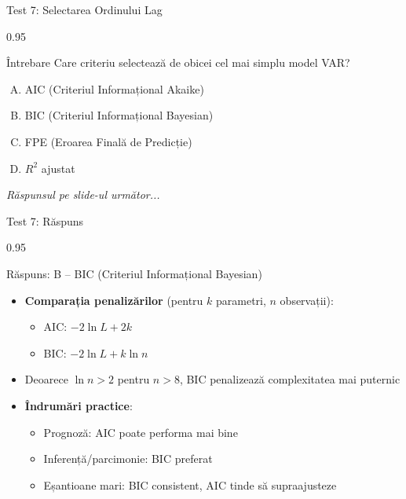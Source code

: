\documentclass[9pt, aspectratio=169, t]{beamer}
\begin{document}
\begin{frame}{Test 7: Selectarea Ordinului Lag}
    \begin{cminipage}{0.95\textwidth}
    \begin{alertblock}{Întrebare}
        Care criteriu selectează de obicei cel mai simplu model VAR?
    \end{alertblock}

    \vspace{0.3cm}

    \begin{enumerate}[A)]\setlength{\itemsep}{0pt}
        \item AIC (Criteriul Informațional Akaike)
        \item BIC (Criteriul Informațional Bayesian)
        \item FPE (Eroarea Finală de Predicție)
        \item $R^2$ ajustat
    \end{enumerate}

    \vspace{0.5cm}
    \begin{flushright}\textit{Răspunsul pe slide-ul următor...}\end{flushright}
    \end{cminipage}
\end{frame}

\begin{frame}{Test 7: Răspuns}
    \begin{cminipage}{0.95\textwidth}
    \begin{exampleblock}{Răspuns: B -- BIC (Criteriul Informațional Bayesian)}
        \begin{itemize}\setlength{\itemsep}{0pt}
            \item \textbf{Comparația penalizărilor} (pentru $k$ parametri, $n$ observații):
            \begin{itemize}\setlength{\itemsep}{0pt}
                \item AIC: $-2\ln L + 2k$
                \item BIC: $-2\ln L + k\ln n$
            \end{itemize}
            \item Deoarece $\ln n > 2$ pentru $n > 8$, BIC penalizează complexitatea mai puternic
            \item \textbf{Îndrumări practice}:
            \begin{itemize}\setlength{\itemsep}{0pt}
                \item Prognoză: AIC poate performa mai bine
                \item Inferență/parcimonie: BIC preferat
                \item Eșantioane mari: BIC consistent, AIC tinde să supraajusteze
            \end{itemize}
        \end{itemize}
    \end{exampleblock}
    \end{cminipage}
\end{frame}
\end{document}
